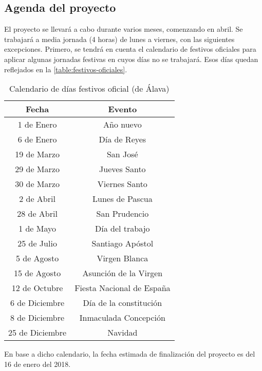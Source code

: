 \subsection{Agenda del proyecto}
El proyecto se llevará a cabo durante varios meses, comenzando en abril. Se trabajará a media jornada (4 horas) de lunes a viernes, con las siguientes excepciones. Primero, se tendrá en cuenta el calendario de festivos oficiales para aplicar algunas jornadas festivas en cuyos días no se trabajará. Esos días quedan reflejados en la \autoref{table:festivos-oficiales}.

\begin{table}[H]
	\centering
	\begin{tabular}{ |c|c| } 
		\hline
		Fecha & Evento \\
		\hline
		1 de Enero & Año nuevo \\
		6 de Enero & Día de Reyes \\
		19 de Marzo & San José \\
		29 de Marzo & Jueves Santo \\
		30 de Marzo & Viernes Santo \\
		2 de Abril & Lunes de Pascua \\
		28 de Abril & San Prudencio \\
		1 de Mayo & Día del trabajo \\
		25 de Julio & Santiago Apóstol \\
		5 de Agosto & Virgen Blanca \\
		15 de Agosto & Asunción de la Virgen \\
		12 de Octubre & Fiesta Nacional de España \\
		6 de Diciembre & Día de la constitución \\
		8 de Diciembre & Inmaculada Concepción \\
		25 de Diciembre & Navidad \\
		\hline
	\end{tabular}
	\caption{Calendario de días festivos oficial (de Álava)}
	\label{table:festivos-oficiales}
\end{table}

En base a dicho calendario, la fecha estimada de finalización del proyecto es del 16 de enero del 2018.

